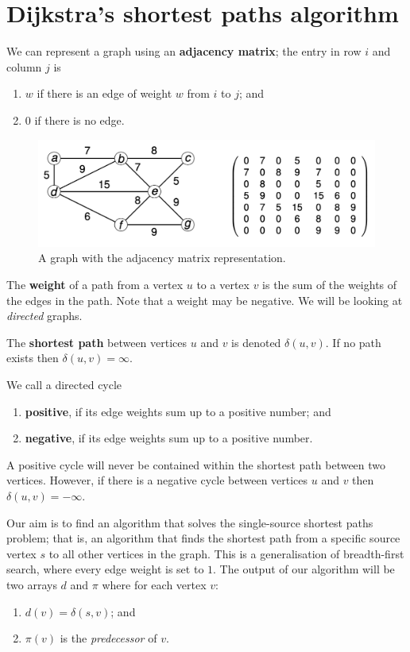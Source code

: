 \chapter{Dijkstra's shortest paths algorithm}

We can represent a graph using an \textbf{adjacency matrix};
the entry in row $i$ and column $j$ is
\begin{enumerate}
    \item $w$ if there is an edge of weight $w$ from $i$ to $j$; and
    \item $0$ if there is no edge.
\end{enumerate}

\begin{figure}
    \centering
    \includegraphics[width=0.8\linewidth]{images/adj-matrix.png}
    \caption{A graph with the adjacency matrix representation.}
    \label{fig:adj-matrix}
\end{figure}

The \textbf{weight} of a path from a vertex $u$ to a vertex $v$ is the
sum of the weights of the edges in the path.
Note that a weight may be negative. 
We will be looking at \emph{directed} graphs.

The \textbf{shortest path} between vertices $u$ and $v$ is denoted 
$\delta(u, v)$.
If no path exists then $\delta(u, v) = \infty$. 

We call a directed cycle
\begin{enumerate}
    \item \textbf{positive}, if its edge weights sum up to a positive number; and 
    \item \textbf{negative}, if its edge weights sum up to a positive number.
\end{enumerate}

A positive cycle will never be contained within the shortest path between two 
vertices.
However, if there is a negative cycle between vertices $u$ and $v$ then
$\delta(u, v) = -\infty$.

Our aim is to find an algorithm that solves the single-source shortest paths
problem; that is, an algorithm that finds the shortest path from a specific 
source vertex $s$ to all other vertices in the graph.
This is a generalisation of breadth-first search, where every edge weight is set
to $1$. The output of our algorithm will be two arrays $d$ and $\pi$ where for
each vertex $v$:
\begin{enumerate}
    \item $d(v) = \delta(s, v)$; and
    \item $\pi(v)$ is the \emph{predecessor} of $v$.
\end{enumerate}

